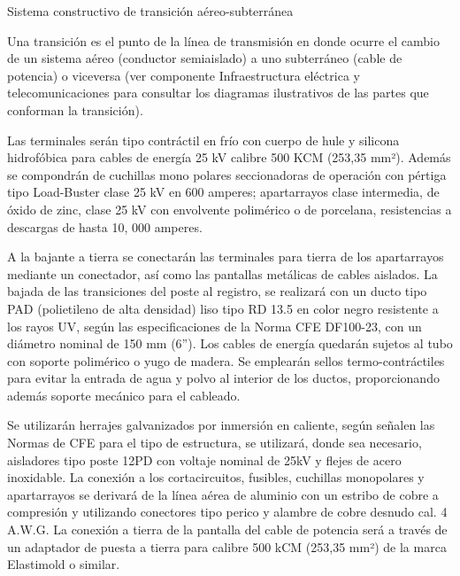 \documentclass{article}
\begin{document}
\bigskip

Sistema constructivo de transición aéreo-subterránea


\bigskip

Una transición es el punto de la línea de transmisión en donde ocurre el cambio de un sistema aéreo (conductor semiaislado) a uno subterráneo (cable de potencia) o viceversa (ver componente Infraestructura eléctrica y telecomunicaciones para consultar los diagramas ilustrativos de las partes que conforman la transición). 


\bigskip

Las terminales serán tipo contráctil en frío con cuerpo de hule y silicona hidrofóbica para cables de energía 25 kV calibre 500 KCM (253,35 mm²). Además se compondrán de cuchillas mono polares seccionadoras de operación con pértiga tipo Load-Buster clase 25 kV en 600 amperes; apartarrayos clase intermedia, de óxido de zinc, clase 25 kV con envolvente polimérico o de porcelana, resistencias a descargas de hasta 10, 000 amperes.


\bigskip

A la bajante a tierra se conectarán las terminales para tierra de los apartarrayos mediante un conectador, así como las pantallas metálicas de cables aislados. La bajada de las transiciones del poste al registro, se realizará con un ducto tipo PAD (polietileno de alta densidad) liso tipo RD 13.5 en color negro resistente a los rayos UV, según las especificaciones de la Norma CFE DF100-23, con un diámetro nominal de 150 mm (6”). Los cables de energía quedarán sujetos al tubo con soporte polimérico o yugo de madera. Se emplearán sellos termo-contráctiles para evitar la entrada de agua y polvo al interior de los ductos, proporcionando además soporte mecánico para el cableado.


\bigskip

Se utilizarán herrajes galvanizados por inmersión en caliente, según señalen las Normas de CFE para el tipo de estructura, se utilizará, donde sea necesario, aisladores tipo poste 12PD con voltaje nominal de 25kV y flejes de acero inoxidable. La conexión a los cortacircuitos, fusibles, cuchillas monopolares y apartarrayos se derivará de la línea aérea de aluminio con un estribo de cobre a compresión y utilizando conectores tipo perico y alambre de cobre desnudo cal. 4 A.W.G. La conexión a tierra de la pantalla del cable de potencia será a través de un adaptador de puesta a tierra para calibre 500 kCM (253,35 mm²) de la marca Elastimold o similar. 
\end{document}
